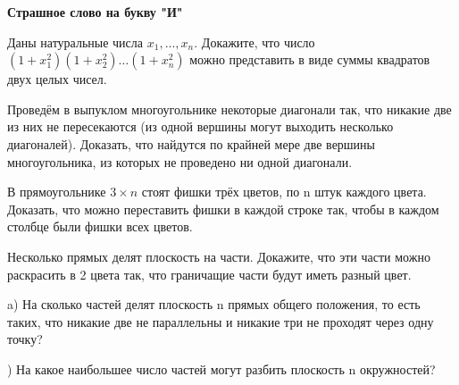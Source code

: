 \hspace{3mm}

\centerline{\bf \Huge Страшное слово на букву "И"}

\begin{flushright}
    \scriptsize{}
\end{flushright}

Даны натуральные числа $x_1, ..., x_n$. Докажите, что число 
$(1+x_1^2)(1+x_2^2)\ldots(1+x_n^2)$
можно представить в виде суммы квадратов двух целых чисел.

Проведём в выпуклом многоугольнике некоторые диагонали так, что никакие две из них не пересекаются (из одной вершины могут выходить несколько диагоналей). Доказать, что найдутся по крайней мере две вершины многоугольника, из которых не проведено ни одной диагонали.

В прямоугольнике $3\times n$ стоят фишки трёх цветов, по n штук каждого цвета. Доказать, что можно переставить фишки в каждой строке так, чтобы в каждом столбце были фишки всех цветов.

Несколько прямых делят плоскость на части. Докажите, что эти части можно раскрасить в 2 цвета так, что граничащие части будут иметь разный цвет.

a) На сколько частей делят плоскость n прямых общего положения, то есть таких, что никакие две не параллельны и никакие три не проходят через одну точку?

) На какое наибольшее число частей могут разбить плоскость n окружностей?




